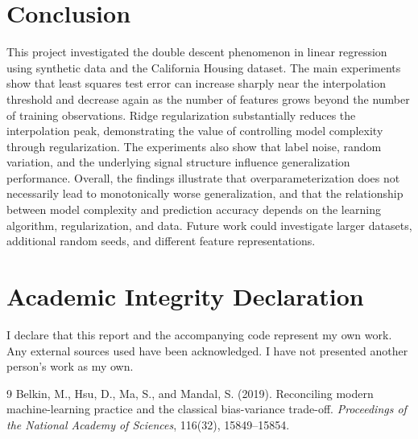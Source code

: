 \documentclass[11pt,a4paper]{article}
\begin{document}
\section{Conclusion}
This project investigated the double
descent phenomenon in linear regression
using synthetic data and the California
Housing dataset.
The main experiments show that least
squares test error can increase sharply
near the interpolation threshold and
decrease again as the number of
features grows beyond the number
of training observations.
Ridge regularization substantially
reduces the interpolation peak,
demonstrating the value of controlling
model complexity through
regularization.
The experiments also show that label
noise, random variation, and the
underlying signal structure influence
generalization performance.
Overall, the findings illustrate
that overparameterization does not
necessarily lead to monotonically
worse generalization, and that
the relationship between model
complexity and prediction accuracy
depends on the learning algorithm,
regularization, and data.
Future work could investigate
larger datasets, additional random
seeds, and different feature
representations.

\section*{Academic Integrity Declaration}
I declare that this report and the accompanying code represent my own work.
Any external sources used have been acknowledged. I have not presented
another person's work as my own.\par

\begin{thebibliography}{9}
    Belkin, M., Hsu, D., Ma, S., and Mandal, S. (2019).
    Reconciling modern machine-learning practice
    and the classical bias-variance trade-off.
    \textit{Proceedings of the National Academy of Sciences},
    116(32), 15849--15854.
    \end{thebibliography}
\end{document}
